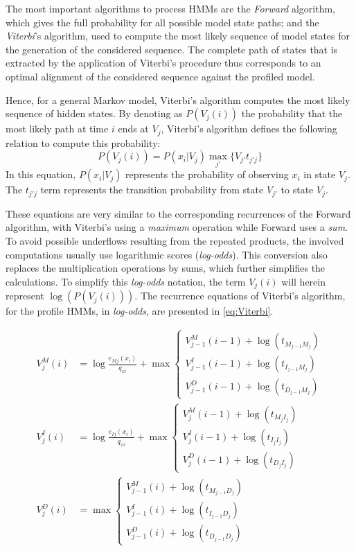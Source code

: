 \documentclass{bmcart}
\begin{document}
The most important algorithms to process \acp{HMM} are the \textit{Forward} algorithm, which gives the full probability for all possible model state paths; and the \textit{Viterbi}'s algorithm, used to compute the most likely sequence of model states for the generation of the considered sequence. The complete path of states that is extracted by the application of Viterbi's procedure thus corresponds to an optimal alignment of the considered sequence against the profiled model.

Hence, for a general Markov model, Viterbi's algorithm computes the most likely sequence of hidden states. By denoting as $P(V_j (i))$ the probability that the most likely path at time $i$ ends at $V_j$, Viterbi's algorithm defines the following relation to compute this probability:
\begin{equation}
\label{eq:Viterbi_def}
P(V_j (i)) = P(x_i | V_j)
\max_{j'} \{V_{j'} t_{j'j}\}
\end{equation}
In this equation, $P(x_i | V_j)$ represents the probability of observing $x_i$ in state $V_j$. The $t_{j'j}$ term represents the transition probability from state $V_{j'}$ to state $V_{j}$. 

These equations are very similar to the corresponding recurrences of the Forward algorithm, with Viterbi's using a \textit{maximum} operation while Forward uses a \textit{sum}. To avoid possible underflows resulting from the repeated products, the involved computations usually use logarithmic scores (\textit{log-odds}). This conversion also replaces the multiplication operations by sums, which further simplifies the calculations. To simplify this \textit{log-odds} notation, the term $V_j (i)$ will herein represent $\log (P(V_j (i)))$. The recurrence equations of Viterbi's algorithm, for the profile \acp{HMM}, in \textit{log-odds}, are presented in \autoref{eq:Viterbi}.

\begin{align}
\label{eq:Viterbi}
 V^M_j(i) &= \log \frac{e_{Mj}(x_i) }{q_{xi}} + \max  
		\begin{cases}
			V^M_{j-1} (i-1) + \log (t_{M_{j-1} M_j})  \\
			V^I_{j-1} (i-1) + \log (t_{I_{j-1} M_j})  \\
			V^D_{j-1} (i-1) + \log (t_{D_{j-1} M_j}) 
		\end{cases}\nonumber \\
V^I_j(i) &= \log \frac{e_{Ij}(x_i) }{q_{xi}} + \max  
		\begin{cases}
			V^M_{j} (i-1) + \log (t_{M_{j} I_j})  \\
			V^I_{j} (i-1) + \log (t_{I_{j} I_j})  \\
			V^D_{j} (i-1) + \log (t_{D_{j} I_j})
		\end{cases}\\
V^D_j(i) &= \max \begin{cases}
			V^M_{j-1} (i) + \log (t_{M_{j-1} D_j})  \\
			V^I_{j-1} (i) + \log (t_{I_{j-1} D_j})  \\
			V^D_{j-1} (i) + \log (t_{D_{j-1} D_j}) 
		\end{cases} \nonumber
\end{align}
\end{document}

